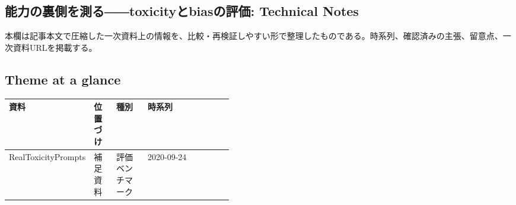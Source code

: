 \subsection*{能力の裏側を測る――toxicityとbiasの評価: Technical Notes}
本欄は記事本文で圧縮した一次資料上の情報を、比較・再検証しやすい形で整理したものである。時系列、確認済みの主張、留意点、一次資料URLを掲載する。
\smallskip
{}\par
\medskip
\subsection*{Theme at a glance}
\begin{center}
\footnotesize
\begin{tabularx}{\linewidth}{@{}p{0.20\linewidth}p{0.10\linewidth}p{0.14\linewidth}X@{}}
\toprule
資料 & 位置づけ & 種別 & 時系列 \\
\midrule
RealToxicityPrompts & 補足資料 & 評価ベンチマーク & 2020-09-24 \\
\bottomrule
\end{tabularx}
\end{center}
\normalsize

